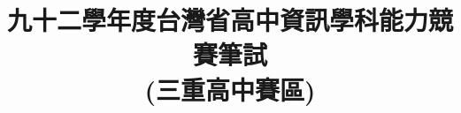 \documentclass[12pt,a4paper]{report}
\begin{document}
\begin{CJK}{UTF8}{bkai}

\renewcommand{\figurename}{圖}
\renewcommand{\tablename}{表}
\renewcommand{\contentsname}{目~錄~}
\renewcommand{\listfigurename}{插~圖~目~錄}
\renewcommand{\listtablename}{表~格~目~錄}
\renewcommand{\appendixname}{附~錄}
\renewcommand{\bibname}{參~考~文~獻}     %
\renewcommand{\indexname}{索~引}
\renewcommand{\today}{\number\year~年~\number\month~月~\number\day~日}

\title{九十二學年度台灣省高中資訊學科能力競賽筆試\\(三重高中賽區)}
\date{}
\maketitle


\end{CJK}
\end{document}
